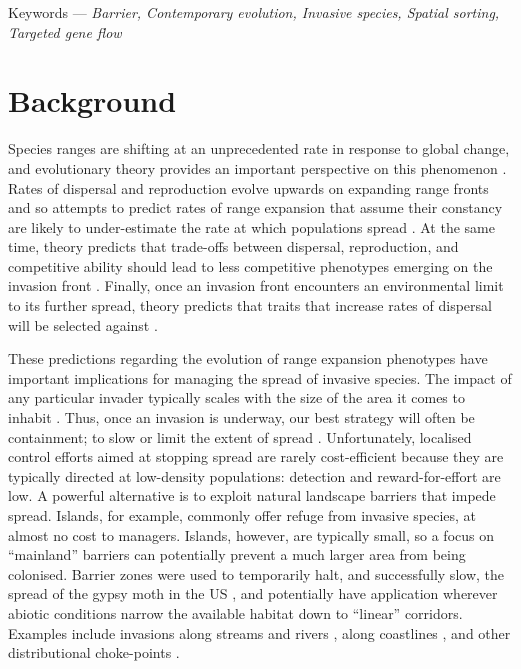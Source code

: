 \documentclass{article}
\begin{document}
Keywords --- \emph{Barrier, Contemporary evolution, Invasive species, Spatial sorting, Targeted gene flow}


    
\newpage
\section{Background}
Species ranges are shifting at an unprecedented rate in response to global change, and evolutionary theory provides an important perspective on this phenomenon \citep{Perkins_2012}.  Rates of dispersal and reproduction evolve upwards on expanding range fronts and so attempts to predict rates of range expansion that assume their constancy are likely to under-estimate the rate at which populations spread \citep{Phillips_Brown_Shine_2010}. At the same time, theory predicts that trade-offs between dispersal, reproduction, and competitive ability should lead to less competitive phenotypes emerging on the invasion front \citep{Burton_Travis_Phillips_2010}. Finally, once an invasion front encounters an environmental limit to its further spread, theory predicts that traits that increase rates of dispersal will be selected against \citep{Kubisch_Hovestadt_Poethke_2010, Phillips_2012}.

These predictions regarding the evolution of range expansion phenotypes have important implications for managing the spread of invasive species.  The impact of any particular invader typically scales with the size of the area it comes to inhabit \citep{Epanchin-Niell_Hastings_2010}.  Thus, once an invasion is underway, our best strategy will often be containment; to slow or limit the extent of spread \citep{Sharov_1998}.  Unfortunately, localised control efforts aimed at stopping spread are rarely cost-efficient because they are typically directed at low-density populations: detection and reward-for-effort are low. A powerful alternative is to exploit natural landscape barriers that impede spread. Islands, for example, commonly offer refuge from invasive species, at almost no cost to managers.  Islands, however, are typically small, so a focus on ``mainland'' barriers can potentially prevent a much larger area from being colonised.  Barrier zones were used to temporarily halt, and successfully slow, the spread of the gypsy moth in the US \citep{Sharov_Liebhold_1998}, and potentially have application wherever abiotic conditions narrow the available habitat down to ``linear'' corridors.  Examples include invasions along streams and rivers \citep[e.g.,][]{Kerby_Riley_Kats_Wilson_2005}, along coastlines \citep[e.g.,][]{Cousens_Cousens_2011}, and other distributional choke-points \citep[e.g.,][]{Tingley_Phillips_Letnic_Brown_Shine_Baird_2013}.
\end{document}
